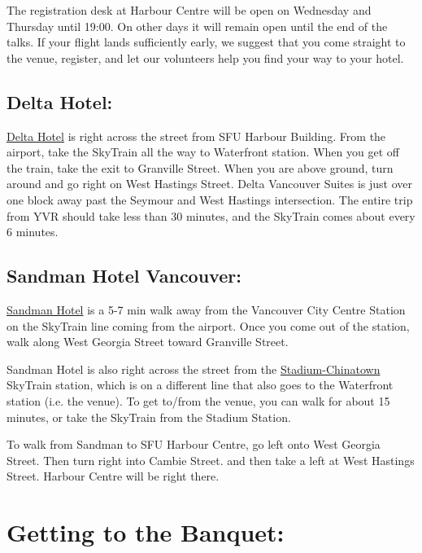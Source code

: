 \documentclass[letterpaper,12pt]{article}
\begin{document}
The registration desk at Harbour Centre will be open on Wednesday and Thursday until 19:00. On other days it will remain open until the end of the talks. If your flight lands sufficiently early, we suggest that you come straight to the venue, register, and let our volunteers help you find your way to your hotel. 

\subsection*{Delta Hotel:}

\href{http://www.marriott.com/hotels/travel/yvrdv-delta-vancouver-suites/}{Delta Hotel} is right across the street from SFU Harbour Building. From the airport, take the SkyTrain all the way to Waterfront station. When you get off the train, take the exit to Granville Street. When you are above ground, turn around and go right on West Hastings Street. Delta Vancouver Suites is just over one block away past the Seymour and West Hastings intersection. The entire trip from YVR should take less than 30 minutes, and the SkyTrain comes about every 6 minutes.

\subsection*{Sandman Hotel Vancouver:}
 
\href{https://www.sandmanhotels.com/locations/british-columbia/vancouver/hotels/vancouver-city-centre-vcc?property=VCC&adults=2&children=0&dates=2017-01-24_2017-01-29&groupCode=912299&fromSearch=1&currency=CAD}{Sandman Hotel} is a 5-7 min walk away from the Vancouver City Centre Station on the SkyTrain line coming from the airport. Once you come out of the station, walk along West Georgia Street toward Granville Street. 

Sandman Hotel is also right across the street from the \href{http://infomaps.translink.ca/System_Maps/skytrain_station_maps/stadium_chinatown_station.pdf}{Stadium-Chinatown} SkyTrain station, which is on a different line that also goes to the Waterfront station (i.e. the venue). To get to/from the venue, you can walk for about 15 minutes, or take the SkyTrain from the Stadium Station.

To walk from Sandman to SFU Harbour Centre, go left onto West Georgia Street. Then turn right into Cambie Street. and then take a left at West Hastings Street. Harbour Centre will be right there.


\section*{Getting to the Banquet:}
\end{document}
